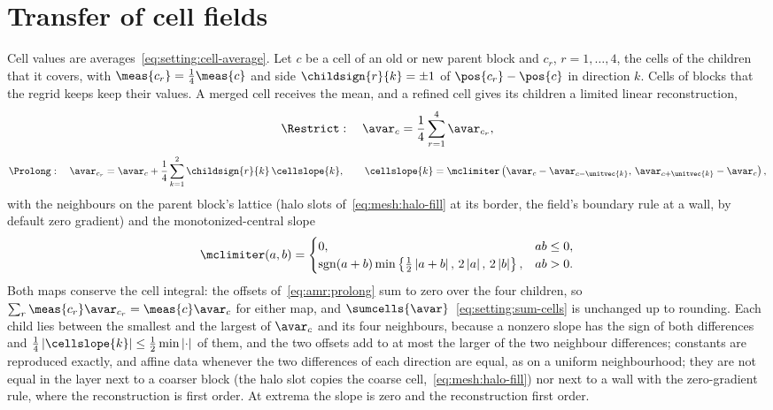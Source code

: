 \section{Transfer of cell fields}\label{sec:amr:cell}
Cell values are averages~\cref{eq:setting:cell-average}. Let $c$ be a cell
of an old or new parent block and $c_r$, $r=1,\dots,4$, the cells of the
children that it covers, with $\meas{c_r}=\frac14\meas{c}$ and side
$\childsign{r}{k}=\pm1$ of $\pos{c_r}-\pos{c}$ in direction $k$. Cells of
blocks that the regrid keeps keep their values. A merged cell receives the
mean, and a refined cell gives its children a limited linear
reconstruction,
\begin{equation}\label{eq:amr:restrict}
  \Restrict:\quad \avar_c=\frac14\sum_{r=1}^{4}\avar_{c_r},
\end{equation}
\begin{equation}\label{eq:amr:prolong}
  \Prolong:\quad \avar_{c_r}=\avar_c+\frac14\sum_{k=1}^{2}\childsign{r}{k}\,\cellslope{k},\qquad
  \cellslope{k}=\mclimiter\roundpar{\avar_c-\avar_{c-\unitvec{k}},\,\avar_{c+\unitvec{k}}-\avar_c},
\end{equation}
with the neighbours on the parent block's lattice (halo slots
of~\cref{eq:mesh:halo-fill} at its border, the field's boundary rule at a
wall, by default zero gradient) and the monotonized-central slope
\begin{equation}\label{eq:amr:mc}
  \mclimiter(a,b)=\begin{cases}
    0, & ab\le0,\\
    \operatorname{sgn}(a+b)\min\curlypar{\tfrac12\abs{a+b},\,2\abs{a},\,2\abs{b}}, & ab>0.
  \end{cases}
\end{equation}
Both maps conserve the cell integral: the offsets of~\cref{eq:amr:prolong} sum
to zero over the four children, so
$\sum_r\meas{c_r}\avar_{c_r}=\meas{c}\avar_c$ for either map, and
$\sumcells{\avar}$~\cref{eq:setting:sum-cells} is unchanged up to rounding.
Each child lies between the smallest and the largest of $\avar_c$ and its four
neighbours, because a nonzero slope has the sign of both differences and
$\frac14\abs{\cellslope{k}}\le\frac12\min\abs{\cdot}$ of them, and the two
offsets add to at most the larger of the two neighbour differences; constants
are reproduced exactly, and affine data whenever the two differences of each
direction are equal, as on a uniform neighbourhood; they are not equal in the
layer next to a coarser block (the halo slot copies the coarse
cell,~\cref{eq:mesh:halo-fill}) nor next to a wall with the zero-gradient
rule, where the reconstruction is first order. At extrema the slope is zero
and the reconstruction first order.

